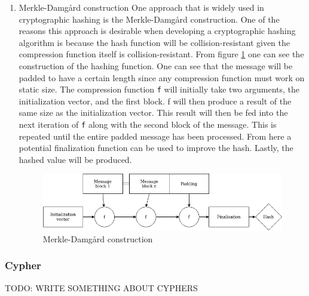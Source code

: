 \documentclass[a4paper]{article}
\begin{document}
\begin{enumerate}
\item Merkle-Damgård construction
\label{sec:orgb527c5f}
One approach that is widely used in cryptographic hashing is the Merkle-Damgård construction. One of the reasons this approach is desirable when developing a cryptographic hashing algorithm is because the hash function will be collision-resistant given the compression function itself is collision-resistant.
From figure \ref{fig:Merkle} one can see the construction of the hashing function. One can see that the message will be padded to have a certain length since any compression function must work on static size. The compression function \texttt{f} will initially take two arguments, the initialization vector, and the first block. f will then produce a result of the same size as the initialization vector. This result will then be fed into the next iteration of \texttt{f} along with the second block of the message. This is repeated until the entire padded message has been processed. From here a potential finalization function can be used to improve the hash. Lastly, the hashed value will be produced.

\begin{figure}[htbp]
\centering
\includegraphics[width=.9\linewidth]{Background/merkle.png}
\caption{\label{fig:Merkle}Merkle-Damgård construction}
\end{figure}
\end{enumerate}
\subsubsection{Cypher}
\label{sec:org1724522}
TODO: WRITE SOMETHING ABOUT CYPHERS
\end{document}
